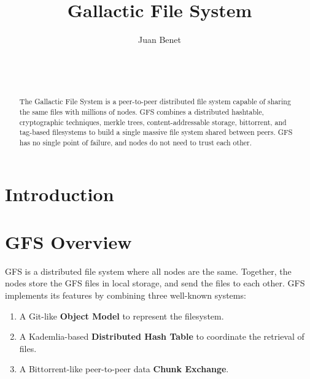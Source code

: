 \documentclass{sig-alternate}
\begin{document}

\title{Gallactic File System}
\subtitle{}


\author{
%
%
\alignauthor
Juan Benet\\
       \\
       \\
       \\
}

\maketitle
\begin{abstract}
The Gallactic File System is a peer-to-peer distributed file system capable of
sharing the same files with millions of nodes. GFS combines a distributed
hashtable, cryptographic techniques, merkle trees, content-addressable
storage, bittorrent, and tag-based filesystems to build a single massive
file system shared between peers. GFS has no single point of failure, and
nodes do not need to trust each other.
\end{abstract}

\section{Introduction}

\section{GFS Overview}

GFS is a distributed file system where all nodes are the same. Together, the
nodes store the GFS files in local storage, and send the files to each other.
GFS implements its features by combining three well-known systems:

\begin{enumerate}
  \item A Git-like \textbf{Object Model} to represent the filesystem.
  \item A Kademlia-based \textbf{Distributed Hash Table} to coordinate the retrieval of files.
  \item A Bittorrent-like peer-to-peer data \textbf{Chunk Exchange}.
\end{enumerate}
\end{document}
